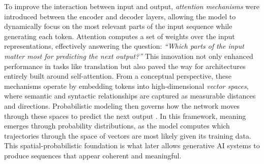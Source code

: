 To improve the interaction between input and output, \emph{attention mechanisms}
were introduced between the encoder and decoder layers, allowing the model to
dynamically focus on the most relevant parts of the input sequence while
generating each \gls{token}. Attention computes a set of weights over the input
representations, effectively answering the question:
\emph{“Which parts of the input matter most for predicting the next output?”}
This innovation not only enhanced performance in tasks like translation but
also paved the way for architectures entirely built around self-attention. From a conceptual perspective, these mechanisms operate by embedding tokens
into high-dimensional \emph{vector spaces}, where semantic and syntactic
relationships are captured as measurable distances and directions.
Probabilistic modeling then governs how the network moves through these spaces
to predict the next output \parencite[198]{montanari2025}. In this framework,
meaning emerges through probability distributions, as the
model computes which trajectories through the space of vectors are most
likely given its training data. This spatial-probabilistic foundation is what
later allows generative AI systems to produce sequences that appear coherent
and meaningful.


